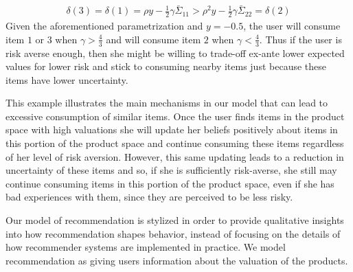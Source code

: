 \documentclass[format=acmsmall, review=false]{acmart}
\newcommand{\xhdr}[1]{\vspace{1mm} \noindent{\bf #1}}
\begin{document}
\begin{align*}
\delta(3) = \delta(1) = \rho y - \frac{1}{2} \gamma \bar{\Sigma}_{11} > \rho^{2} y - \frac{1}{2} \gamma \bar{\Sigma}_{22} = \delta(2)
\end{align*}
Given the aforementioned parametrization and $y = -0.5$, the user will consume item $1$ or $3$ when $\gamma > \frac{4}{3}$ and will consume item $2$ when $\gamma < \frac{4}{3}$. Thus if the user is risk averse enough, then she might be willing to trade-off ex-ante lower expected values for lower risk and stick to consuming nearby items just because these items have lower uncertainty. 
\par 
This example illustrates the main mechanisms in our model that can lead to excessive consumption of similar items. Once the user finds items in the product space with high valuations she will update her beliefs positively about items in this portion of the product space and continue consuming these items regardless of her level of risk aversion. However, this same updating leads to a reduction in uncertainty of these items and so, if she is sufficiently risk-averse, she still may continue consuming items in this portion of the product space, even if she has bad experiences with them, since they are perceived to be less risky. 
\par

\xhdr{Recommendation.}
Our model of recommendation is stylized in order to provide qualitative insights into how recommendation shapes behavior, instead of focusing on the details of how recommender systems are implemented in practice. We model recommendation as giving users information about the valuation of the products.
\par
\end{document}
